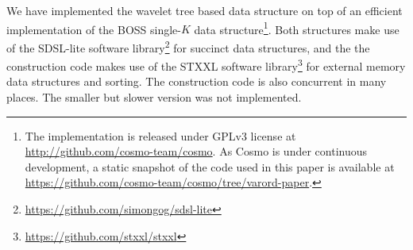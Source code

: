 \begin{table}[t!]
\begin{tabularx}{\textwidth}{@{}Rd{3.2}d{4.9}d{3.2}d{4.9}d{3.2}d{5.9}d{3.2}d{5.9}@{}}

\bottomrule
\end{tabularx}
\label{tab:nav-time}
\end{table}

We have implemented the wavelet tree based data structure on top of an efficient implementation of the BOSS single-$K$ data structure\footnote{The
implementation is released under GPLv3 license at \url{http://github.com/cosmo-team/cosmo}. As Cosmo is under continuous development,
a static snapshot of the code used in this paper is available at \url{https://github.com/cosmo-team/cosmo/tree/varord-paper}.}.
Both structures make use of the SDSL-lite software library\footnote{\url{https://github.com/simongog/sdsl-lite}} for succinct data structures, and the
the construction code makes use of the STXXL software library\footnote{\url{https://github.com/stxxl/stxxl}} for external memory data structures and sorting.
The construction code is also concurrent in many places.%
The smaller but slower version was not implemented.

